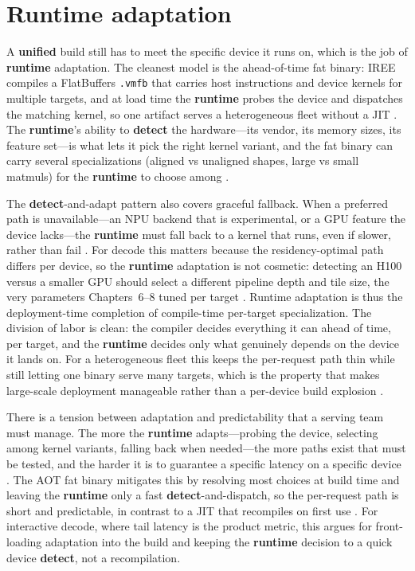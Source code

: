 \section{Runtime adaptation}
\label{sec:ch24_runtime_adapt}

A \textbf{unified} build still has to meet the specific device it runs on, which is the job of \textbf{runtime} adaptation. The cleanest model is the ahead-of-time fat binary: IREE compiles a FlatBuffers \texttt{.vmfb} that carries host instructions and device kernels for multiple targets, and at load time the \textbf{runtime} probes the device and dispatches the matching kernel, so one artifact serves a heterogeneous fleet without a JIT \citep{iree2024}. The \textbf{runtime}'s ability to \textbf{detect} the hardware---its vendor, its memory sizes, its feature set---is what lets it pick the right kernel variant, and the fat binary can carry several specializations (aligned vs unaligned shapes, large vs small matmuls) for the \textbf{runtime} to choose among \citep{iree2024}.

The \textbf{detect}-and-adapt pattern also covers graceful fallback. When a preferred path is unavailable---an NPU backend that is experimental, or a GPU feature the device lacks---the \textbf{runtime} must fall back to a kernel that runs, even if slower, rather than fail \citep{iree2024,rotem2018glow}. For decode this matters because the residency-optimal path differs per device, so the \textbf{runtime} adaptation is not cosmetic: detecting an H100 versus a smaller GPU should select a different pipeline depth and tile size, the very parameters Chapters~6--8 tuned per target \citep{nvidia2022hopper,memoryfloor2026}. Runtime adaptation is thus the deployment-time completion of compile-time per-target specialization. The division of labor is clean: the compiler decides everything it can ahead of time, per target, and the \textbf{runtime} decides only what genuinely depends on the device it lands on. For a heterogeneous fleet this keeps the per-request path thin while still letting one binary serve many targets, which is the property that makes large-scale deployment manageable rather than a per-device build explosion \citep{iree2024,patel2025llminference}.

There is a tension between adaptation and predictability that a serving team must manage. The more the \textbf{runtime} adapts---probing the device, selecting among kernel variants, falling back when needed---the more paths exist that must be tested, and the harder it is to guarantee a specific latency on a specific device \citep{iree2024,patel2025llminference}. The AOT fat binary mitigates this by resolving most choices at build time and leaving the \textbf{runtime} only a fast \textbf{detect}-and-dispatch, so the per-request path is short and predictable, in contrast to a JIT that recompiles on first use \citep{iree2024,rotem2018glow}. For interactive decode, where tail latency is the product metric, this argues for front-loading adaptation into the build and keeping the \textbf{runtime} decision to a quick device \textbf{detect}, not a recompilation.

